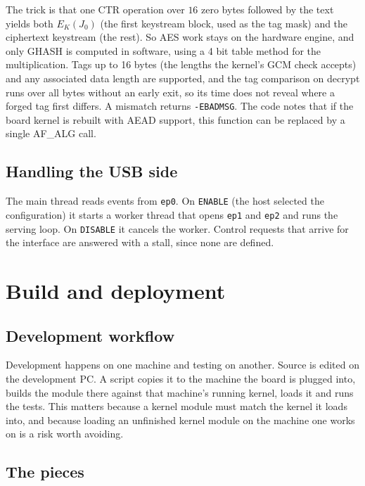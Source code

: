 \documentclass[11pt,a4paper,oneside]{report}
\newcommand{\code}[1]{\texttt{\small #1}}
\begin{document}
The trick is that one CTR operation over $16$ zero bytes followed by the text yields both $E_K(J_0)$ (the first keystream block, used as the tag mask) and the ciphertext keystream (the rest). So AES work stays on the hardware engine, and only GHASH is computed in software, using a 4 bit table method for the multiplication. Tags up to 16 bytes (the lengths the kernel's GCM check accepts) and any associated data length are supported, and the tag comparison on decrypt runs over all bytes without an early exit, so its time does not reveal where a forged tag first differs. A mismatch returns \code{-EBADMSG}. The code notes that if the board kernel is rebuilt with AEAD support, this function can be replaced by a single AF\_ALG call.

\section{Handling the USB side}

The main thread reads events from \code{ep0}. On \code{ENABLE} (the host selected the configuration) it starts a worker thread that opens \code{ep1} and \code{ep2} and runs the serving loop. On \code{DISABLE} it cancels the worker. Control requests that arrive for the interface are answered with a stall, since none are defined.





\chapter{Build and deployment}\label{ch:build}

\section{Development workflow}

Development happens on one machine and testing on another. Source is edited on the development PC. A script copies it to the machine the board is plugged into, builds the module there against that machine's running kernel, loads it and runs the tests. This matters because a kernel module must match the kernel it loads into, and because loading an unfinished kernel module on the machine one works on is a risk worth avoiding.

\section{The pieces}
\end{document}
